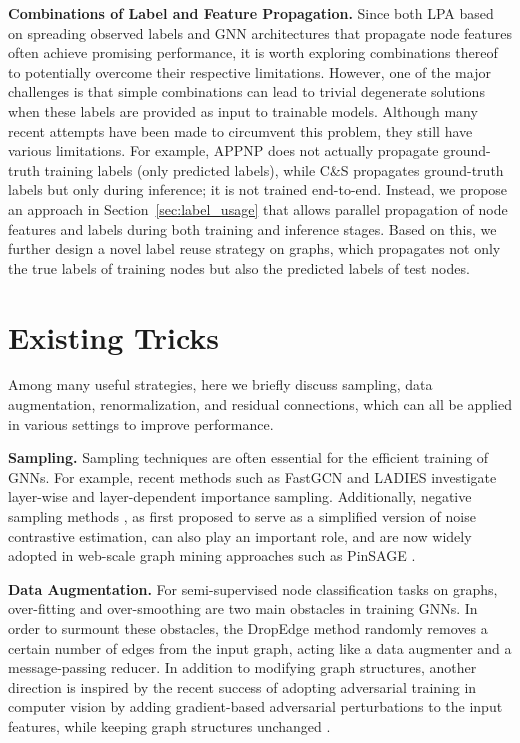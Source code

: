 \documentclass[sigconf,screen,nonacm]{acmart} \usepackage{booktabs}
\newcommand{\minisection}[1]{\vspace{5pt}\noindent\textbf{#1.}}
\begin{document}
	\minisection{Combinations of Label and Feature Propagation}
	Since both LPA based on spreading observed labels and GNN architectures that propagate node features often achieve promising performance, it is worth exploring combinations thereof to potentially overcome their respective limitations.
However, one of the major challenges is that simple combinations can lead to trivial degenerate solutions when these labels are provided as input to trainable models. 
    Although many recent attempts have been made to circumvent this problem, they still have various limitations.  For example, APPNP \citep{klicpera2018predict} does not actually propagate ground-truth training labels (only predicted labels), while C\&S \citep{huang2020combining} propagates ground-truth labels but only during inference; it is not trained end-to-end.
Instead, we propose an approach in Section~\ref{sec:label_usage} that allows parallel propagation of node features and labels during both training and inference stages.
Based on this, we further design a novel label reuse strategy on graphs, which propagates not only the true labels of training nodes but also the predicted labels of test nodes.
	
	\section{Existing Tricks}
Among many useful strategies, here we briefly discuss sampling, data augmentation, renormalization, and residual connections, which can all be applied in various settings to improve performance.



	\minisection{Sampling}
Sampling techniques \citep{chen2018fastgcn,zou2019layer,hamilton2017inductive} are often essential for the efficient training of GNNs.
For example, recent methods such as FastGCN \citep{chen2018fastgcn} and LADIES \citep{zou2019layer} investigate layer-wise and layer-dependent importance sampling.
Additionally, negative sampling methods \citep{mikolov2013distributed}, as first proposed to serve as a simplified version of noise contrastive estimation, can also play an important role, and are now widely adopted in web-scale graph mining approaches such as PinSAGE \citep{ying2018graph}.


	\minisection{Data Augmentation}
	For semi-supervised node classification tasks on graphs, over-fitting and over-smoothing \citep{li2018deeper} are two main obstacles in training GNNs.
	In order to surmount these obstacles, the DropEdge method \citep{rong2019dropedge} randomly removes a certain number of edges from the input graph, acting like a data augmenter and a message-passing reducer.
	In addition to modifying graph structures, another direction is inspired by the recent success of adopting adversarial training in computer vision \citep{xie2020adversarial} by adding gradient-based adversarial perturbations to the input features, while keeping graph structures unchanged \citep{kong2020flag}.
	
\end{document}
